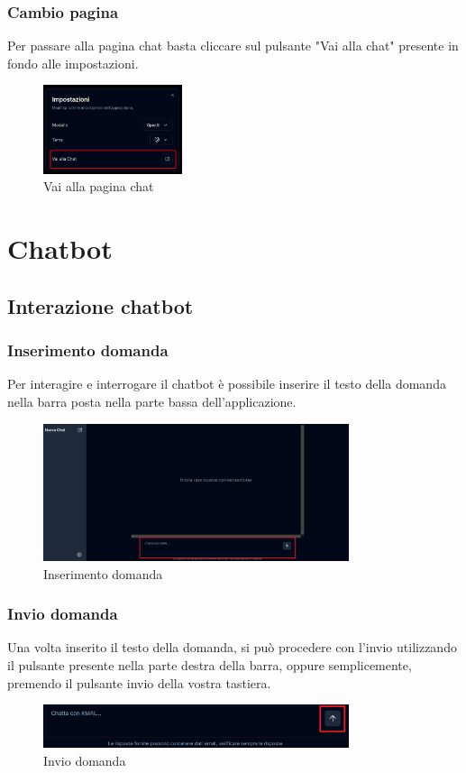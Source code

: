 \subsubsection{Cambio pagina}
Per passare alla pagina chat basta cliccare sul pulsante "Vai alla chat" presente in fondo alle impostazioni.
\begin{figure}[h!]
    \centering
    \includegraphics[width=0.364\textwidth]{settingdocchange.png}
    \caption{Vai alla pagina chat}\label{fig:changepage}
\end{figure}

\newpage
\section{Chatbot}\label{secchatbot}

\subsection{Interazione chatbot}
\subsubsection{Inserimento domanda}
Per interagire e interrogare il chatbot è possibile inserire il testo della domanda nella barra posta nella parte bassa dell'applicazione.
\begin{figure}[h!]
    \centering
    \includegraphics[width=0.8\textwidth]{inserttextchat.png}
    \caption{Inserimento domanda}\label{fig:inserttextchat}
\end{figure}
\subsubsection{Invio domanda}
Una volta inserito il testo della domanda, si può procedere con l'invio utilizzando il pulsante presente nella parte destra della barra, oppure semplicemente, premendo il pulsante invio della vostra tastiera.
\begin{figure}[h!]
    \centering
    \includegraphics[width=0.8\textwidth]{buttoninserttextchat.png}
    \caption{Invio domanda}\label{fig:buttoninserttextchat}
\end{figure}
